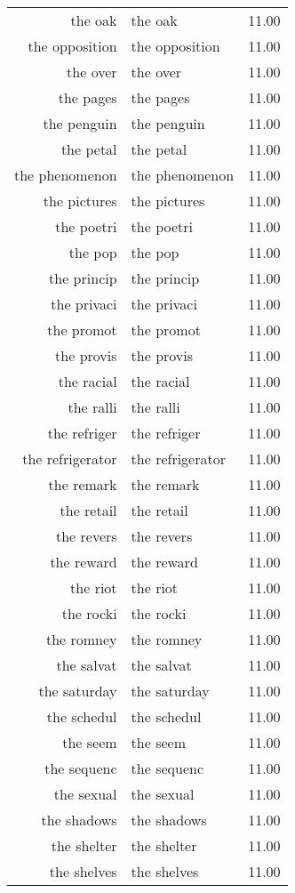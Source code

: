 \begin{table}[ht]
\begin{tabular}{rlr}
  the oak & the oak & 11.00 \\ 
  the opposition & the opposition & 11.00 \\ 
  the over & the over & 11.00 \\ 
  the pages & the pages & 11.00 \\ 
  the penguin & the penguin & 11.00 \\ 
  the petal & the petal & 11.00 \\ 
  the phenomenon & the phenomenon & 11.00 \\ 
  the pictures & the pictures & 11.00 \\ 
  the poetri & the poetri & 11.00 \\ 
  the pop & the pop & 11.00 \\ 
  the princip & the princip & 11.00 \\ 
  the privaci & the privaci & 11.00 \\ 
  the promot & the promot & 11.00 \\ 
  the provis & the provis & 11.00 \\ 
  the racial & the racial & 11.00 \\ 
  the ralli & the ralli & 11.00 \\ 
  the refriger & the refriger & 11.00 \\ 
  the refrigerator & the refrigerator & 11.00 \\ 
  the remark & the remark & 11.00 \\ 
  the retail & the retail & 11.00 \\ 
  the revers & the revers & 11.00 \\ 
  the reward & the reward & 11.00 \\ 
  the riot & the riot & 11.00 \\ 
  the rocki & the rocki & 11.00 \\ 
  the romney & the romney & 11.00 \\ 
  the salvat & the salvat & 11.00 \\ 
  the saturday & the saturday & 11.00 \\ 
  the schedul & the schedul & 11.00 \\ 
  the seem & the seem & 11.00 \\ 
  the sequenc & the sequenc & 11.00 \\ 
  the sexual & the sexual & 11.00 \\ 
  the shadows & the shadows & 11.00 \\ 
  the shelter & the shelter & 11.00 \\ 
  the shelves & the shelves & 11.00 \\ 

\end{tabular}
\end{table}
